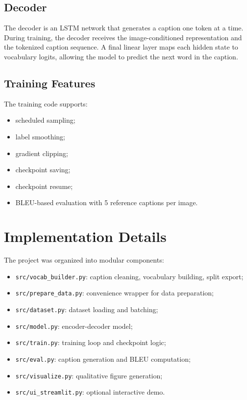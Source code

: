 \documentclass[11pt,a4paper]{article}
\begin{document}
\subsection{Decoder}

The decoder is an LSTM network that generates a caption one token at a time. During training, the decoder receives the image-conditioned representation and the tokenized caption sequence. A final linear layer maps each hidden state to vocabulary logits, allowing the model to predict the next word in the caption.

\subsection{Training Features}

The training code supports:
\begin{itemize}[leftmargin=*]
    \item scheduled sampling;
    \item label smoothing;
    \item gradient clipping;
    \item checkpoint saving;
    \item checkpoint resume;
    \item BLEU-based evaluation with 5 reference captions per image.
\end{itemize}

\section{Implementation Details}

The project was organized into modular components:
\begin{itemize}[leftmargin=*]
    \item \texttt{src/vocab\_builder.py}: caption cleaning, vocabulary building, split export;
    \item \texttt{src/prepare\_data.py}: convenience wrapper for data preparation;
    \item \texttt{src/dataset.py}: dataset loading and batching;
    \item \texttt{src/model.py}: encoder-decoder model;
    \item \texttt{src/train.py}: training loop and checkpoint logic;
    \item \texttt{src/eval.py}: caption generation and BLEU computation;
    \item \texttt{src/visualize.py}: qualitative figure generation;
    \item \texttt{src/ui\_streamlit.py}: optional interactive demo.
\end{itemize}
\end{document}
